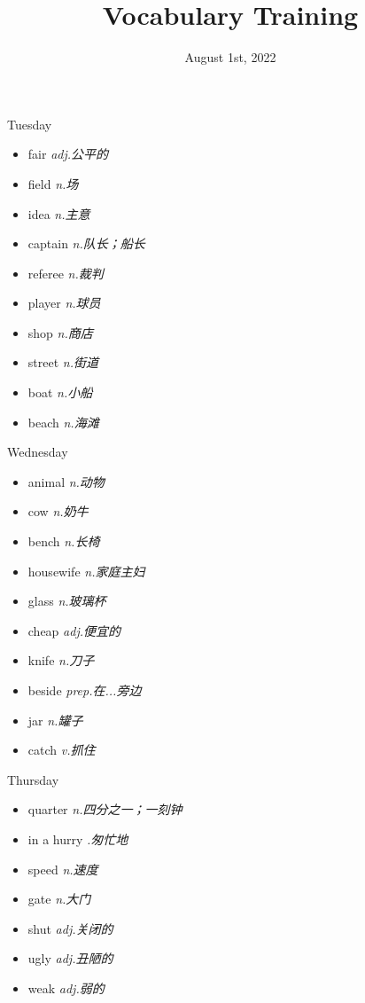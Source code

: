 \documentclass{ctexart}
\title{Vocabulary Training}
\date{August 1st, 2022}
\begin{document}
\maketitle
\begin{multicols}{2}
\begin{textbox}{Tuesday}
\begin{itemize}
\item fair \emph{adj.公平的}
\item field \emph{n.场}
\item idea \emph{n.主意}
\item captain \emph{n.队长；船长}
\item referee \emph{n.裁判}
\item player \emph{n.球员}
\item shop \emph{n.商店}
\item street \emph{n.街道}
\item boat \emph{n.小船}
\item beach \emph{n.海滩}
\end{itemize}
\end{textbox}
\begin{textbox}{Wednesday}
\begin{itemize}
\item animal \emph{n.动物}
\item cow \emph{n.奶牛}
\item bench \emph{n.长椅}
\item housewife \emph{n.家庭主妇}
\item glass \emph{n.玻璃杯}
\item cheap \emph{adj.便宜的}
\item knife \emph{n.刀子}
\item beside \emph{prep.在...旁边}
\item jar \emph{n.罐子}
\item catch \emph{v.抓住}
\end{itemize}
\end{textbox}
\begin{textbox}{Thursday}
\begin{itemize}
\item quarter \emph{n.四分之一；一刻钟}
\item in a hurry \emph{.匆忙地}
\item speed \emph{n.速度}
\item gate \emph{n.大门}
\item shut \emph{adj.关闭的}
\item ugly \emph{adj.丑陋的}
\item weak \emph{adj.弱的}

\end{itemize}
\end{textbox}
\end{multicols}
\end{document}
